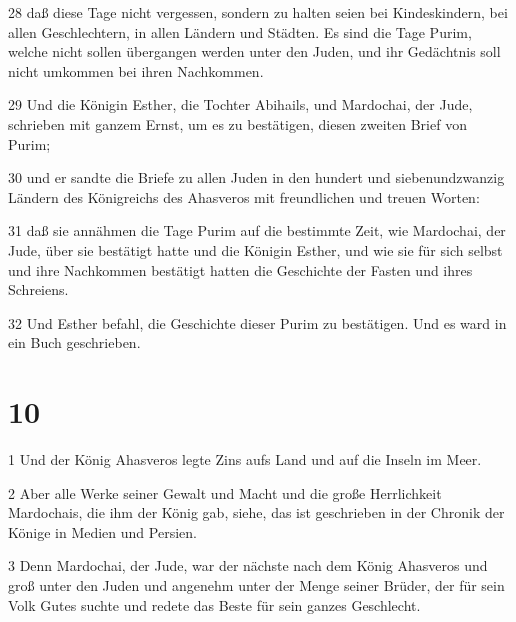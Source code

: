 \par 28 daß diese Tage nicht vergessen, sondern zu halten seien bei Kindeskindern, bei allen Geschlechtern, in allen Ländern und Städten. Es sind die Tage Purim, welche nicht sollen übergangen werden unter den Juden, und ihr Gedächtnis soll nicht umkommen bei ihren Nachkommen.
\par 29 Und die Königin Esther, die Tochter Abihails, und Mardochai, der Jude, schrieben mit ganzem Ernst, um es zu bestätigen, diesen zweiten Brief von Purim;
\par 30 und er sandte die Briefe zu allen Juden in den hundert und siebenundzwanzig Ländern des Königreichs des Ahasveros mit freundlichen und treuen Worten:
\par 31 daß sie annähmen die Tage Purim auf die bestimmte Zeit, wie Mardochai, der Jude, über sie bestätigt hatte und die Königin Esther, und wie sie für sich selbst und ihre Nachkommen bestätigt hatten die Geschichte der Fasten und ihres Schreiens.
\par 32 Und Esther befahl, die Geschichte dieser Purim zu bestätigen. Und es ward in ein Buch geschrieben.

\chapter{10}

\par 1 Und der König Ahasveros legte Zins aufs Land und auf die Inseln im Meer.
\par 2 Aber alle Werke seiner Gewalt und Macht und die große Herrlichkeit Mardochais, die ihm der König gab, siehe, das ist geschrieben in der Chronik der Könige in Medien und Persien.
\par 3 Denn Mardochai, der Jude, war der nächste nach dem König Ahasveros und groß unter den Juden und angenehm unter der Menge seiner Brüder, der für sein Volk Gutes suchte und redete das Beste für sein ganzes Geschlecht.


